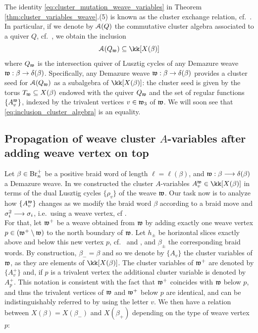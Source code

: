 \vspace{0.2cm}
The identity \eqref{eq:cluster_mutation_weave_variables} in Theorem \ref{thm:cluster_variables_weave}.(5) is known as the cluster exchange relation, cf.~\cite[Definition 3.1.3]{FWZ16}. In particular, if we denote by $\mathcal{A}(Q)$ the commutative cluster algebra associated to a quiver $Q$, cf.~\cite[Def.~3.1.9]{FWZ16}, we obtain the inclusion
\begin{equation}\label{eq:inclusion_cluster_algebra}
\SA(Q_\w)\sse \kk[X(\beta)]
\end{equation}
where $Q_{\mathfrak{w}}$ is the intersection quiver of Lusztig cycles of any Demazure weave $\mathfrak{w}:\beta\to\delta(\beta)$. Specifically, any Demazure weave $\mathfrak{w}:\beta\to\delta(\beta)$ provides a cluster seed for $\mathcal{A}(Q_{\mathfrak{w}})$ as a subalgebra of $\kk[X(\beta)]$: the cluster seed is given by the torus $T_{\mathfrak{w}}\subseteq X(\beta)$ endowed with the quiver $Q_{\mathfrak{w}}$ and the set of regular functions $\{A^{\mathfrak{w}}_v\}$, indexed by the trivalent vertices $v\in\mathfrak{w}_3$ of $\mathfrak{w}$. We will soon see that \eqref{eq:inclusion_cluster_algebra} is an equality.

\subsection{Propagation of weave cluster $A$-variables after adding weave vertex on top}\label{ssec:cluster_A_variables_propagation_vertices} Let $\beta\in\mbox{Br}_n^+$ be a positive braid word of length $\ell=\ell(\beta)$, and $\mathfrak{w}:\beta\longrightarrow\delta(\beta)$ a Demazure weave. In  we constructed the cluster $A$-variables $A_v^\w\in\kk[X(\beta)]$ in terms of the dual Lusztig cycles $\{\rho_v\}$ of the weave $\mathfrak{w}$. Our task now is to analyze how $\{A_v^{\mathfrak{w}}\}$ changes as we modify the braid word $\beta$ according to a braid move and $\sigma_i^2\longrightarrow\sigma_i$, i.e.~using a weave vertex, cf .\\

For that, let $\mathfrak{w}^+$ be a weave obtained from $\mathfrak{w}$ by adding exactly one weave vertex $p\in(\mathfrak{w}^+\setminus\mathfrak{w})$ to the north boundary of $\mathfrak{w}$. Let $h_\pm$ be horizontal slices exactly above and below this new vertex $p$, cf.~ and , and $\beta_\pm$ the corresponding braid words. By construction, $\beta_-=\beta$ and so we denote by $\{A_v\}$ the cluster variables of $\mathfrak{w}$, as they are elements of $\kk[X(\beta)]$. The cluster variables of $\mathfrak{w}^+$ are denoted by $\{A_v^+\}$ and, if $p$ is a trivalent vertex the additional cluster variable is denoted by $A^+_p$. This notation is consistent with the fact that $\mathfrak{w}^+$ coincides with $\mathfrak{w}$ below $p$, and thus the trivalent vertices of $\mathfrak{w}$ and $\mathfrak{w}^+$ below $p$ are identical, and can be indistinguishably referred to by using the letter $v$. We then have a relation between $X(\beta)=X(\beta_-)$ and $X(\beta_+)$ depending on the type of weave vertex $p$:

